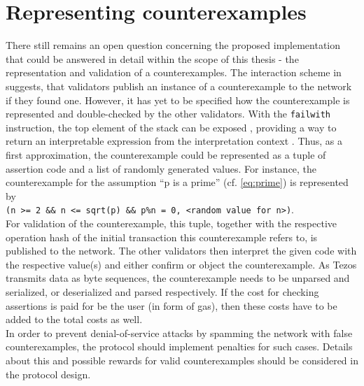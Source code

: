 \section{Representing counterexamples}
There still remains an open question concerning the proposed implementation that could be answered in detail within the scope of this thesis - the representation and validation of a counterexamples. The interaction scheme in  suggests, that validators publish an instance of a counterexample to the network if they found one. However, it has yet to be specified how the counterexample is represented and double-checked by the other validators. With the \texttt{failwith} instruction, the top element of the stack can be exposed \cite{tezos_docs}, providing a way to return an interpretable expression from the interpretation context \cite{tezos_repo}. Thus, as a first approximation, the counterexample could be represented as a tuple of assertion code and a list of randomly generated values. For instance, the counterexample for the assumption ``p is a prime'' (cf. \eqref{eq:prime}) is represented by \\
\texttt{(n >= 2 \&\& n <= sqrt(p) \&\& p\%n = 0, <random value for n>)}. \\
For validation of the counterexample, this tuple, together with the respective operation hash of the initial transaction this counterexample refers to, is published to the network. The other validators then interpret the given code with the respective value(s) and either confirm or object the counterexample. As Tezos transmits data as byte sequences, the counterexample needs to be unparsed and serialized, or deserialized and parsed respectively. If the cost for checking assertions is paid for be the user (in form of gas), then these costs have to be added to the total costs as well.\\
In order to prevent denial-of-service attacks by spamming the network with false counterexamples, the protocol should implement penalties for such cases. Details about this and possible rewards for valid counterexamples should be considered in the protocol design.